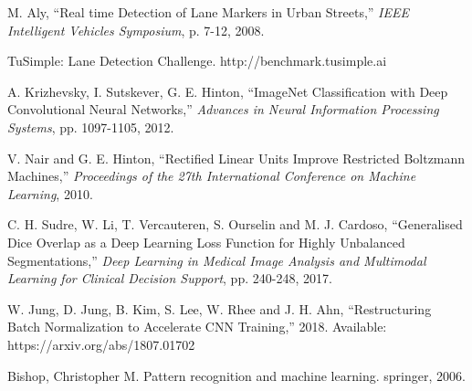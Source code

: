 \documentclass[fleqn,10pt,twocolumn]{ICCAS2019}
\begin{document}
\begin{thebibliography}{99}
M. Aly, ``Real time Detection of Lane Markers in Urban Streets,'' {\it IEEE Intelligent Vehicles Symposium}, p. 7-12, 2008.

TuSimple: Lane Detection Challenge. http://benchmark.tusimple.ai

A. Krizhevsky, I. Sutskever, G. E. Hinton, ``ImageNet Classification with Deep Convolutional Neural Networks,'' {\it Advances in Neural Information Processing Systems}, pp. 1097-1105, 2012.

V. Nair and G. E. Hinton, ``Rectified Linear Units Improve Restricted Boltzmann Machines,'' {\it Proceedings of the 27th International Conference on Machine Learning}, 2010.

C. H. Sudre, W. Li, T. Vercauteren, S. Ourselin and M. J. Cardoso, ``Generalised Dice Overlap as a Deep Learning Loss Function for Highly Unbalanced Segmentations,'' {\it Deep Learning in Medical Image Analysis and Multimodal Learning for Clinical Decision Support}, pp. 240-248, 2017.

W. Jung, D. Jung, B. Kim, S. Lee, W. Rhee and J. H. Ahn, ``Restructuring Batch Normalization to Accelerate CNN Training,'' 2018. Available: https://arxiv.org/abs/1807.01702

Bishop, Christopher M. Pattern recognition and machine learning. springer, 2006.
\end{thebibliography}
\end{document}
